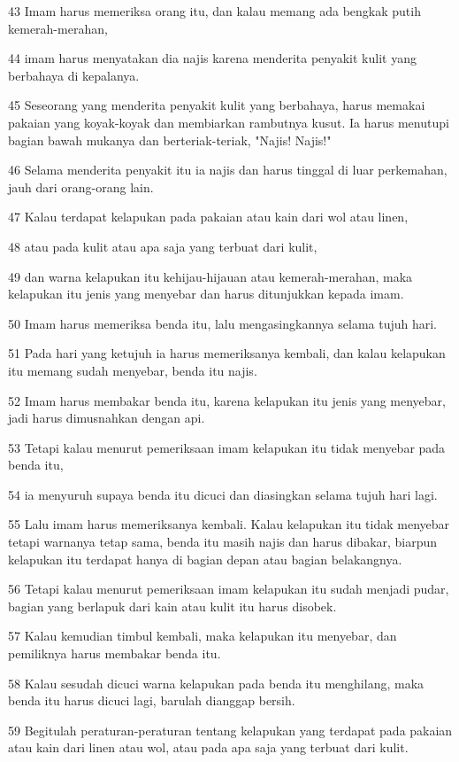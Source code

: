 \par 43 Imam harus memeriksa orang itu, dan kalau memang ada bengkak putih kemerah-merahan,
\par 44 imam harus menyatakan dia najis karena menderita penyakit kulit yang berbahaya di kepalanya.
\par 45 Seseorang yang menderita penyakit kulit yang berbahaya, harus memakai pakaian yang koyak-koyak dan membiarkan rambutnya kusut. Ia harus menutupi bagian bawah mukanya dan berteriak-teriak, "Najis! Najis!"
\par 46 Selama menderita penyakit itu ia najis dan harus tinggal di luar perkemahan, jauh dari orang-orang lain.
\par 47 Kalau terdapat kelapukan pada pakaian atau kain dari wol atau linen,
\par 48 atau pada kulit atau apa saja yang terbuat dari kulit,
\par 49 dan warna kelapukan itu kehijau-hijauan atau kemerah-merahan, maka kelapukan itu jenis yang menyebar dan harus ditunjukkan kepada imam.
\par 50 Imam harus memeriksa benda itu, lalu mengasingkannya selama tujuh hari.
\par 51 Pada hari yang ketujuh ia harus memeriksanya kembali, dan kalau kelapukan itu memang sudah menyebar, benda itu najis.
\par 52 Imam harus membakar benda itu, karena kelapukan itu jenis yang menyebar, jadi harus dimusnahkan dengan api.
\par 53 Tetapi kalau menurut pemeriksaan imam kelapukan itu tidak menyebar pada benda itu,
\par 54 ia menyuruh supaya benda itu dicuci dan diasingkan selama tujuh hari lagi.
\par 55 Lalu imam harus memeriksanya kembali. Kalau kelapukan itu tidak menyebar tetapi warnanya tetap sama, benda itu masih najis dan harus dibakar, biarpun kelapukan itu terdapat hanya di bagian depan atau bagian belakangnya.
\par 56 Tetapi kalau menurut pemeriksaan imam kelapukan itu sudah menjadi pudar, bagian yang berlapuk dari kain atau kulit itu harus disobek.
\par 57 Kalau kemudian timbul kembali, maka kelapukan itu menyebar, dan pemiliknya harus membakar benda itu.
\par 58 Kalau sesudah dicuci warna kelapukan pada benda itu menghilang, maka benda itu harus dicuci lagi, barulah dianggap bersih.
\par 59 Begitulah peraturan-peraturan tentang kelapukan yang terdapat pada pakaian atau kain dari linen atau wol, atau pada apa saja yang terbuat dari kulit.

